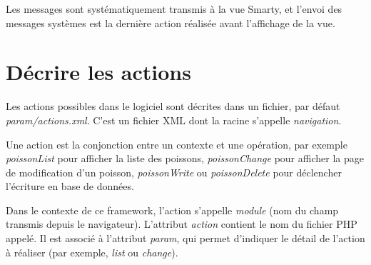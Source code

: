 Les messages sont systématiquement transmis à la vue Smarty, et l'envoi des messages systèmes est la dernière action réalisée avant l'affichage de la vue.

\chapter{Décrire les actions}\label{labelxml}

Les actions possibles dans le logiciel sont décrites dans un fichier, par défaut \textit{param/actions.xml}. C'est un fichier XML dont la racine s'appelle \textit{navigation}. 

Une action est la conjonction entre un contexte et une opération, par exemple \textit{poissonList} pour afficher la liste des poissons, \textit{poissonChange} pour afficher la page de modification d'un poisson, \textit{poissonWrite} ou \textit{poissonDelete} pour déclencher l'écriture en base de données.

Dans le contexte de ce framework, l'action s'appelle \textit{module} (nom du champ transmis depuis le navigateur). L'attribut \textit{action} contient le nom du fichier PHP appelé. Il est associé à l'attribut \textit{param}, qui permet d'indiquer le détail de l'action à réaliser (par exemple, \textit{list} ou \textit{change}).

